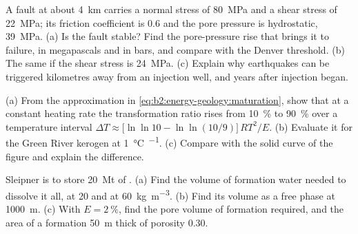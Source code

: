 \begin{exercise}[$\star\star\star$]\label{exo:b2:energy-geology:10}
A fault at about \qty{4}{km} carries a normal stress of \qty{80}{MPa} and a shear stress of
\qty{22}{MPa}; its friction coefficient is 0.6 and the pore pressure is hydrostatic,
\qty{39}{MPa}. (a) Is the fault stable? Find the pore-pressure rise that brings it to failure, in
megapascals and in bars, and compare with the Denver threshold. (b) The same if the shear stress is
\qty{24}{MPa}. (c) Explain why earthquakes can be triggered kilometres away from an injection well,
and years after injection began.
\end{exercise}

\begin{exercise}[$\star\star\star$]\label{exo:b2:energy-geology:11}
(a) From the approximation in \eqref{eq:b2:energy-geology:maturation}, show that at a constant
heating rate the transformation ratio rises from \qty{10}{\percent} to \qty{90}{\percent} over a
temperature interval $\Delta T \approx \bigl[\ln\ln 10 - \ln\ln(10/9)\bigr]\,RT^2/E$. (b) Evaluate it
for the Green River kerogen at \qty{1}{\celsius\per\Myr}. (c) Compare with the solid curve of the
figure and explain the difference.
\end{exercise}

\begin{exercise}[$\star\star\star$]\label{exo:b2:energy-geology:12}
Sleipner is to store \qty{20}{Mt} of . (a) Find the volume of formation water needed to
dissolve it all, at 20 and at \qty{60}{kg.m^{-3}}. (b) Find its volume as a free phase at
\qty{1000}{m}. (c) With $E = \qty{2}{\percent}$, find the pore volume of formation required, and
the area of a formation \qty{50}{m} thick of porosity 0.30.
\end{exercise}

